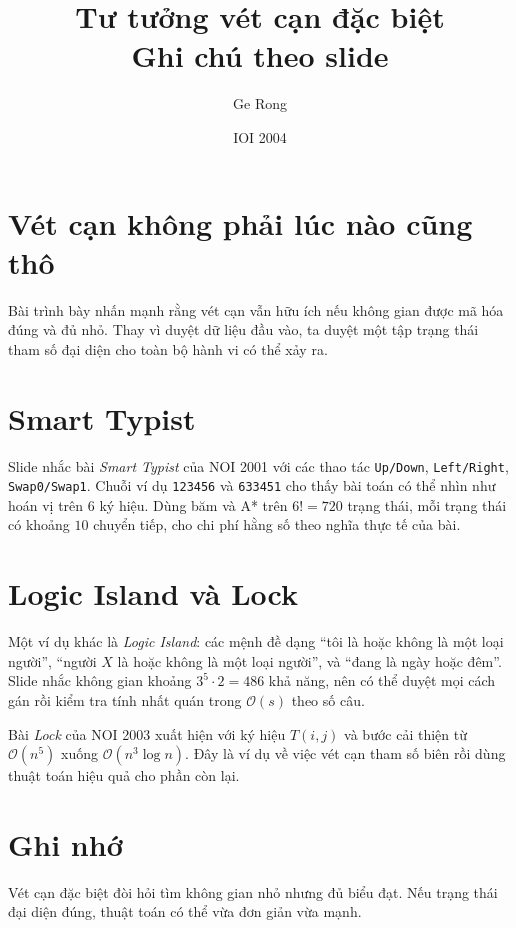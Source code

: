 \documentclass[11pt]{article}
\title{Tư tưởng vét cạn đặc biệt\\{\large Ghi chú theo slide}}
\author{Ge Rong}
\date{IOI 2004}
\newcommand{\Oh}{\mathcal{O}}
\begin{document}
\maketitle


\section{Vét cạn không phải lúc nào cũng thô}

Bài trình bày nhấn mạnh rằng vét cạn vẫn hữu ích nếu không gian được mã hóa
đúng và đủ nhỏ. Thay vì duyệt dữ liệu đầu vào, ta duyệt một tập trạng thái
tham số đại diện cho toàn bộ hành vi có thể xảy ra.

\section{Smart Typist}

Slide nhắc bài \emph{Smart Typist} của NOI 2001 với các thao tác
\texttt{Up/Down}, \texttt{Left/Right}, \texttt{Swap0/Swap1}. Chuỗi ví dụ
\texttt{123456} và \texttt{633451} cho thấy bài toán có thể nhìn như hoán vị
trên \(6\) ký hiệu. Dùng băm và A* trên \(6!=720\) trạng thái, mỗi trạng thái
có khoảng \(10\) chuyển tiếp, cho chi phí hằng số theo nghĩa thực tế của bài.

\section{Logic Island và Lock}

Một ví dụ khác là \emph{Logic Island}: các mệnh đề dạng ``tôi là hoặc không
là một loại người'', ``người \(X\) là hoặc không là một loại người'', và
``đang là ngày hoặc đêm''. Slide nhắc không gian khoảng \(3^5\cdot 2=486\)
khả năng, nên có thể duyệt mọi cách gán rồi kiểm tra tính nhất quán trong
\(\Oh(s)\) theo số câu.

Bài \emph{Lock} của NOI 2003 xuất hiện với ký hiệu \(T(i,j)\) và bước cải
thiện từ \(\Oh(n^5)\) xuống \(\Oh(n^3\log n)\). Đây là ví dụ về việc vét
cạn tham số biên rồi dùng thuật toán hiệu quả cho phần còn lại.

\section{Ghi nhớ}

Vét cạn đặc biệt đòi hỏi tìm không gian nhỏ nhưng đủ biểu đạt. Nếu trạng thái
đại diện đúng, thuật toán có thể vừa đơn giản vừa mạnh.
\end{document}
